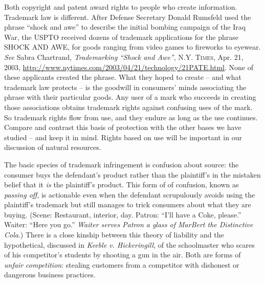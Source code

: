 \item Both copyright and patent award rights to people who create information.
Trademark law is different. After Defense Secretary Donald Rumsfeld used the
phrase ``shock and awe'' to describe the initial bombing campaign of the Iraq
War, the USPTO received dozens of trademark applications for the phrase SHOCK
AND AWE, for goods ranging from video games to fireworks to eyewear.
\textit{See} Sabra Chartrand,\textit{ Trademarking }\textit{``Shock and Awe''},
\textsc{N.Y. Times}, Apr. 21, 2003,
\url{http://www.nytimes.com/2003/04/21/technology/21PATE.html}. None of these
applicants created the phrase. What they hoped to create -- and what trademark
law protects -- is the goodwill in consumers' minds associating the phrase with
their particular goods. Any user of a mark who succeeds in creating those
associations obtains trademark rights against confusing uses of the mark. So
trademark rights flow from use, and they endure as long as the use continues.
Compare and contrast this basis of protection with the other bases we have
studied -- and keep it in mind. Rights based on use will be important in our
discussion of natural resources.


\item The basic species of trademark infringement is confusion about source: the
consumer buys the defendant's product rather than the plaintiff's in the
mistaken belief that it \textit{is} the plaintiff's product. This form of of
confusion, known as \textit{passing off}, is actionable even when the defendant
scrupulously avoids using the plaintiff's trademark but still manages to trick
consumers about what they are buying. (Scene: Restaurant, interior, day.
Patron: ``I'll have a Coke, please.'' Waiter: ``Here you go.'' \textit{Waiter
serves Patron a glass of MarBert the Distinctive Cola}.) There is a close
kinship between this theory of liability and the hypothetical, discussed in
\textit{Keeble v. Hickeringill}, of the schoolmaster who scares of his
competitor's students by shooting a gun in the air. Both are forms of
\textit{unfair competition}: stealing customers from a competitor with
dishonest or dangerous business practices.

